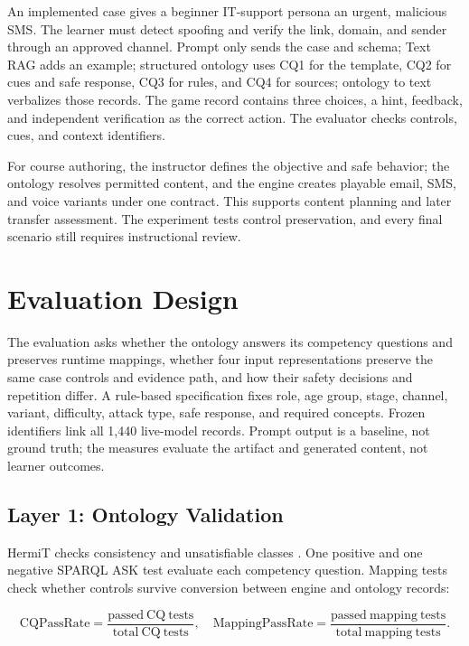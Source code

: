 \documentclass[runningheads]{llncs}
\begin{document}
An implemented case gives a beginner IT-support persona an urgent, malicious SMS.
The learner must detect spoofing and verify the link, domain, and sender through an
approved channel. Prompt only sends the case and schema; Text RAG adds an example;
structured ontology uses CQ1 for the template, CQ2 for cues and safe response, CQ3
for rules, and CQ4 for sources; ontology to text verbalizes those records. The game
record contains three choices, a hint, feedback, and independent verification as
the correct action. The evaluator checks controls, cues, and context identifiers.

For course authoring, the instructor defines the objective and safe behavior; the
ontology resolves permitted content, and the engine creates playable email, SMS,
and voice variants under one contract. This supports content planning and later
transfer assessment. The experiment tests control preservation, and every final
scenario still requires instructional review.

\section{Evaluation Design}

The evaluation asks whether the ontology answers its competency questions and
preserves runtime mappings, whether four input representations preserve the same
case controls and evidence path, and how their safety decisions and repetition
differ. A rule-based specification fixes role, age group, stage, channel, variant,
difficulty, attack type, safe response, and required concepts. Frozen identifiers
link all 1,440 live-model records. Prompt output is a baseline, not ground truth;
the measures evaluate the artifact and generated content, not learner outcomes.

\subsection{Layer 1: Ontology Validation}

HermiT checks consistency and unsatisfiable classes \cite{hermit}. One positive
and one negative SPARQL ASK test evaluate each competency question. Mapping tests
check whether controls survive conversion between engine and ontology records:

\begin{equation}
\mathrm{CQPassRate}=\frac{\mathrm{passed\ CQ\ tests}}
{\mathrm{total\ CQ\ tests}},
\quad
\mathrm{MappingPassRate}=\frac{\mathrm{passed\ mapping\ tests}}
{\mathrm{total\ mapping\ tests}} .
\end{equation}
\end{document}
